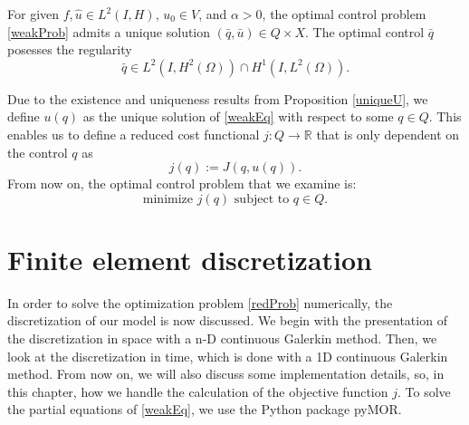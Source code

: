 \begin{prop}
For given $f,\hat{u}\in L^2(I,H)$, $u_0\in V$, and $\alpha>0$, the optimal control problem \eqref{weakProb} admits a unique solution $(\bar{q},\bar{u})\in Q\times X$. The optimal control $\bar{q}$ posesses the regularity
\begin{displaymath}
\bar{q}\in L^2(I,H^2(\Omega))\cap H^1(I,L^2(\Omega)).
\end{displaymath}
\end{prop}

Due to the existence and uniqueness results from Proposition \ref{uniqueU}, we define $u(q)$ as the unique solution of \eqref{weakEq} with respect to some $q\in Q$. This enables us to define a reduced cost functional $j:Q\to \mathbb{R}$ that is only dependent on the control $q$ as
\begin{displaymath}
j(q):=J(q,u(q)).
\end{displaymath}
From now on, the optimal control problem that we examine is:
\begin{equation}
\label{redProb}
\text{minimize }j(q)\text{ subject to }q\in Q.
\end{equation}

\section{Finite element discretization}
In order to solve the optimization problem \eqref{redProb} numerically, the discretization of our model is now discussed. We begin with the presentation of the discretization in space with a n-D continuous Galerkin method. Then, we look at the discretization in time, which is done with a 1D continuous Galerkin method. From now on, we will also discuss some implementation details, so, in this chapter, how we handle the calculation of the objective function $j$. To solve the partial equations of \eqref{weakEq}, we use the Python package pyMOR.

